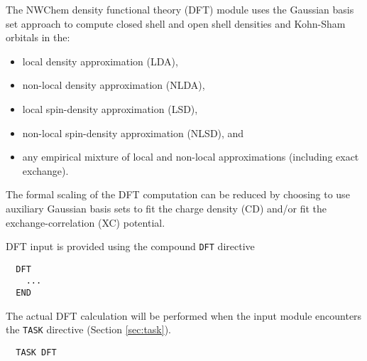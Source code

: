 %
%
\label{sec:dft}

The NWChem density functional theory (DFT) module uses the
Gaussian basis set approach to compute
closed shell and open shell densities and Kohn-Sham orbitals
in the: 
\begin{itemize}
\item local density approximation (LDA), 
\item non-local density approximation (NLDA), 
\item local spin-density approximation (LSD), 
\item non-local spin-density approximation (NLSD), and
\item any empirical mixture of local and non-local approximations 
(including exact exchange).
\end{itemize}

The formal scaling of the DFT computation can be reduced by choosing
to use auxiliary Gaussian basis sets to fit the charge density (CD) and/or 
fit the exchange-correlation (XC) potential.

DFT input is provided using the compound \verb+DFT+ directive
\begin{verbatim}
  DFT
    ...
  END
\end{verbatim}
The actual DFT calculation will be performed when the input module
encounters the \verb+TASK+ directive (Section \ref{sec:task}).  
\begin{verbatim}
  TASK DFT
\end{verbatim}


